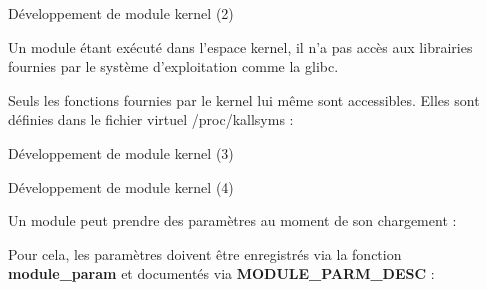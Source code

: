 \documentclass[12pt, t]{beamer}
\begin{document}
\begin{frame}{Développement de module kernel (2)}

    \vspace{12pt}
    Un module étant exécuté dans l'espace kernel, il n'a pas accès aux
    librairies fournies par le système d'exploitation comme la glibc.

    {
        \vspace{12pt}
        Seuls les fonctions fournies par le kernel lui même sont accessibles. Elles
        sont définies dans le fichier virtuel /proc/kallsyms :

        \vspace{12pt}
        \lstsyms
    }

\end{frame}

\begin{frame}{Développement de module kernel (3)}

    

\end{frame}



\begin{frame}{Développement de module kernel (4)}

    \vspace{15pt}
    Un module peut prendre des paramètres au moment de son chargement :

    \vspace{6pt}
    \lstload

    {
        \vspace{15pt}
        Pour cela, les paramètres doivent être enregistrés via la fonction
        {\textbf{module\_param}} et documentés via
        {\textbf{MODULE\_PARM\_DESC}} :

        \vspace{6pt}
        \lstparam
    }

\end{frame}
\end{document}
